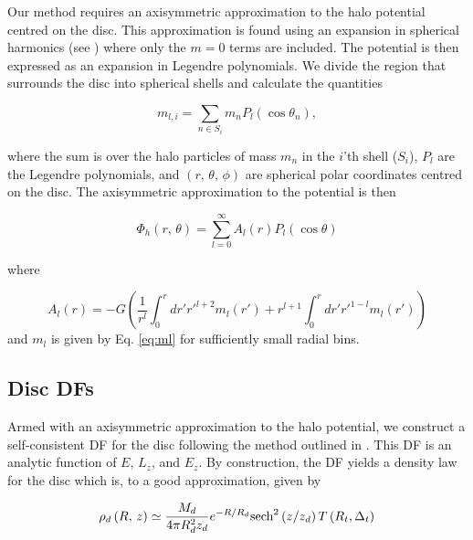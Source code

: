 Our method requires an axisymmetric approximation to the halo
potential centred on the disc.  This approximation is found using an
expansion in spherical harmonics (see \citet{BT}) where only the $m=0$
terms are included.  The potential is then expressed as an expansion
in Legendre polynomials.  We divide the region that surrounds the disc
into spherical shells and calculate the quantities

\begin{equation} \label{eq:ml}
m_{l,i} = \sum_{n\in S_i} m_n P_l(\cos{\theta_n}) ,
\end{equation}

\noindent where the sum is over the halo particles of mass $m_n$ in
the $i$'th shell ($S_i$), $P_l$ are the Legendre polynomials, and
$\left (r,\,\theta,\,\phi\right )$ are spherical polar coordinates
centred on the disc.  The axisymmetric approximation to the potential
is then

\begin{equation}
\Phi_h\left (r,\,\theta\right ) = \sum_{l=0}^\infty A_l\left (r\right
) P_l\left (\cos{\theta}\right )
\end{equation}

\noindent where

\begin{equation}
A_l(r) = -G\left (
\frac{1}{r^l}\int_0^r dr' r'^{l+2} m_l(r')
+r^{l+1}\int_0^r dr' r'^{1-l} m_l(r')\right )
\end{equation}
and $m_l$ is given by Eq. \eqref{eq:ml} for sufficiently small radial
bins.

\subsection{Disc DFs} \label{sec:live_ics}

Armed with an axisymmetric approximation to the halo potential, we
construct a self-consistent DF for the disc following the method
outlined in \citet{DubinskiKuijkenRigidDisks}.  This DF is an analytic
function of $E$, $L_z$, and $E_z$.  By construction, the DF yields a
density law for the disc which is, to a good approximation, given by

\begin{equation}
\rho_d\left (R,\,z\right )\simeq \frac{M_d}{4\pi R_d^2 z_d} e^{-R/R_d}
    {\rm sech}^2\left (z/z_d\right ) T\left (R_t,\Delta_t\right )
\end{equation}

